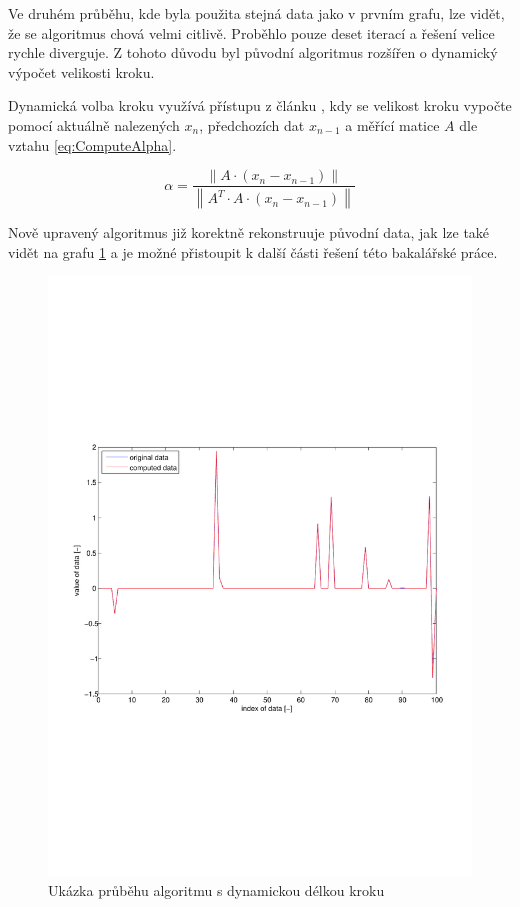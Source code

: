 \documentclass[FM,BP]{tulthesis}
\newcounter{Vzorce}
\begin{document}
Ve druhém průběhu, kde byla použita stejná data jako v prvním grafu, lze vidět, že se algoritmus chová velmi citlivě. Proběhlo pouze deset iterací a řešení velice rychle diverguje. Z tohoto důvodu byl původní algoritmus rozšířen o dynamický výpočet velikosti kroku.

Dynamická volba kroku využívá přístupu z článku \cite{dynamickyKrok}, kdy se velikost kroku vypočte pomocí aktuálně nalezených $x_{n}$, předchozích dat $x_{n-1}$ a měřící matice $A$ dle vztahu \ref{eq:ComputeAlpha}.

\begin{equation} \label{eq:ComputeAlpha}  \tag{Vzorec \theVzorce}
\alpha = \frac{\left\| A \cdot (x_{n} - x_{n-1}) \right\|}{\left\| A^{T} \cdot A \cdot (x_{n} - x_{n-1}) \right\| }
\end{equation}

Nově upravený algoritmus již korektně rekonstruuje původní data, jak lze také vidět na grafu \ref{fig:dynamicAlpha} a je možné přistoupit k další části řešení této bakalářské práce.

\begin{figure}[!ht]
\begin{center}
\includegraphics[scale=0.7]{obr/dynamic.pdf}
\end{center}
\caption{Ukázka průběhu algoritmu s dynamickou délkou kroku}
\label{fig:dynamicAlpha}
\end{figure}
\end{document}
